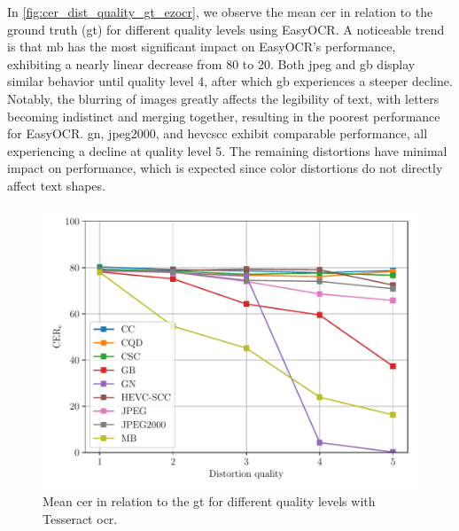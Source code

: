 In \autoref{fig:cer_dist_quality_gt_ezocr}, we observe the mean \gls{cer} in relation to the ground truth (\gls{gt}) for different quality levels using EasyOCR.
A noticeable trend is that \gls{mb} has the most significant impact on EasyOCR's performance, exhibiting a nearly linear decrease from 80 to 20.
Both \gls{jpeg} and \gls{gb} display similar behavior until quality level 4, after which \gls{gb} experiences a steeper decline.
Notably, the blurring of images greatly affects the legibility of text, with letters becoming indistinct and merging together, resulting in the poorest performance for EasyOCR.
\gls{gn}, \gls{jpeg2000}, and \gls{hevcscc} exhibit comparable performance, all experiencing a decline at quality level 5.
The remaining distortions have minimal impact on performance, which is expected since color distortions do not directly affect text shapes.

\begin{figure}[h]
\centering
    \includegraphics[width=\textwidth]{../../images/analyze/cer_dist_quality_gt_tess.pdf}
    \caption{Mean \gls{cer} in relation to the \gls{gt} for different quality levels with Tesseract \gls{ocr}.}
\label{fig:cer_dist_quality_gt_tesseract}
\end{figure}

